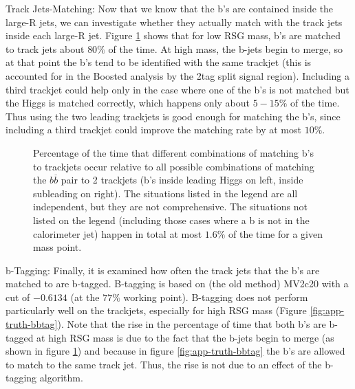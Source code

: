 Track Jets-Matching: Now that we know that the b's are contained inside the large-R jets, we can investigate whether they actually match with the track jets inside each large-R jet. Figure \ref{fig:app-truth-bmatch} shows that for low RSG mass, b's are matched to track jets about $80\%$ of the time. At high mass, the b-jets begin to merge, so at that point the b's tend to be identified with the same trackjet (this is accounted for in the Boosted analysis by the 2tag split signal region). Including a third trackjet could help only in the case where one of the b's is not matched but the Higgs is matched correctly, which happens only about $5-15\%$ of the time. Thus using the two leading trackjets is good enough for matching the b's, since including a third trackjet could improve the matching rate by at most $10\%$.

\begin{figure}[htbp!]
\begin{center}
\qquad
\caption{Percentage of the time that different combinations of matching b's to trackjets occur relative to all possible combinations of matching the $b\overline{b}$ pair to 2 trackjets (b's inside leading Higgs on left, inside subleading on right). The situations listed in the legend are all independent, but they are not comprehensive. The situations not listed on the legend (including those cases where a b is not in the calorimeter jet) happen in total at most $1.6\%$ of the time for a given mass point.}
\label{fig:app-truth-bmatch}
\end{center}
\end{figure}

b-Tagging: Finally, it is examined how often the track jets that the b's are matched to are b-tagged. B-tagging is based on (the old method) MV2c20 with a cut of $-0.6134$ (at the $77\%$ working point). B-tagging does not perform particularly well on the trackjets, especially for high RSG mass (Figure \ref{fig:app-truth-bbtag}). Note that the rise in the percentage of time that both b's are b-tagged at high RSG mass is due to the fact that the b-jets begin to merge (as shown in figure \ref{fig:app-truth-bmatch}) and because in figure \ref{fig:app-truth-bbtag} the b's are allowed to match to the same track jet. Thus, the rise is not due to an effect of the b-tagging algorithm.



